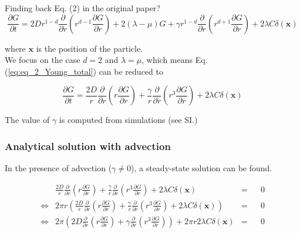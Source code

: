 Finding back Eq. (2) in the original paper?\\	

\begin{equation}
\frac{\partial G}{\partial t}=2Dr^{1-d}\frac{\partial}{\partial r}\left(r^{d-1}\frac{\partial G}{\partial r}\right)+2(\lambda-\mu)G+\gamma r^{1-d}\frac{\partial}{\partial r}\left(r^{d+1}\frac{\partial G}{\partial r}\right)+2\lambda C\delta(\boldsymbol{x})\label{eq:eq_2_Young_total}
\end{equation}

where $\boldsymbol{x}$ is the position of the particle.\\

We focus on the case $d=2$ and $\lambda=\mu$, which means Eq.
(\ref{eq:eq_2_Young_total}) can be reduced to

\begin{equation}
\frac{\partial G}{\partial t}=\frac{2D}{r}\frac{\partial}{\partial r}\left(r\frac{\partial G}{\partial r}\right)+\frac{\gamma}{r}\frac{\partial}{\partial r}\left(r^{3}\frac{\partial G}{\partial r}\right)+2\lambda C\delta(\boldsymbol{x})\label{eq:eq_2_Young_reduced}
\end{equation}

The value of $\gamma$ is computed from simulations (see SI.)

\subsubsection*{Analytical solution with advection}

In the presence of advection ($\gamma\neq0$), a steady-state solution
can be found. 

\begin{align}
  &  \frac{2D}{r}\frac{\partial}{\partial r}\left(r\frac{\partial G}{\partial r}\right)+\frac{\gamma}{r}\frac{\partial}{\partial r}\left(r^{3}\frac{\partial G}{\partial r}\right)+2\lambda C\delta(\boldsymbol{x})\nonumber & = & & 0 \\
\Leftrightarrow & 2\pi r\left(\frac{2D}{r}\frac{\partial}{\partial r}\left(r\frac{\partial G}{\partial r}\right)+\frac{\gamma}{r}\frac{\partial}{\partial r}\left(r^{3}\frac{\partial G}{\partial r}\right)+2\lambda C\delta(\boldsymbol{x})\right)\nonumber & = & & 0 \\
 \Leftrightarrow  & 2\pi\left(2D\frac{\partial}{\partial r}\left(r\frac{\partial G}{\partial r}\right)+\gamma\frac{\partial}{\partial r}\left(r^{3}\frac{\partial G}{\partial r}\right)\right)+2\pi r2\lambda C\delta(\boldsymbol{x}) & = & & 0\label{eq:steady_state}
\end{align}

